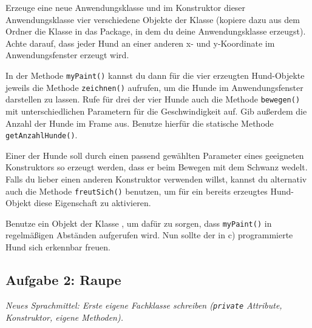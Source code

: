\begin{compactenum}[a)]
\item Erzeuge eine neue Anwendungsklasse  und im
Konstruktor dieser Anwendungsklasse vier verschiedene Objekte der Klasse 
 (kopiere dazu aus dem Ordner  
die Klasse  in das Package, in dem du deine Anwendungsklasse 
erzeugst). Achte darauf, dass jeder Hund an einer anderen x- und y-Koordinate 
im Anwendungsfenster erzeugt wird. 

\item In der Methode \lstinline|myPaint()| kannst du dann für die vier
erzeugten Hund-Objekte jeweils die Methode \lstinline|zeichnen()| aufrufen,
um die Hunde im Anwendungsfenster darstellen zu lassen. Rufe für drei der 
vier Hunde auch die Methode \lstinline|bewegen()| mit unterschiedlichen 
Parametern für die Geschwindigkeit auf. Gib außerdem die Anzahl der Hunde 
im Frame aus. Benutze hierfür die statische Methode \lstinline|getAnzahlHunde()|.

\item Einer der Hunde soll durch einen passend gewählten Parameter eines geeigneten
Konstruktors so erzeugt werden, dass er beim Bewegen mit dem Schwanz wedelt.
Falls du lieber einen anderen Konstruktor verwenden willst, kannst du alternativ
auch die Methode \lstinline|freutSich()| benutzen, um für ein bereits erzeugtes
Hund-Objekt diese Eigenschaft zu aktivieren.

\item Benutze ein Objekt der Klasse , um dafür zu sorgen, dass
\lstinline|myPaint()| in regelmäßigen Abständen aufgerufen wird. Nun sollte der
in c) programmierte Hund sich erkennbar freuen.
\end{compactenum}


\subsection{Aufgabe 2: Raupe \tagPflicht}
\noindent \emph{Neues Sprachmittel: Erste eigene Fachklasse schreiben (\texttt{private} Attribute, Konstruktor, eigene Methoden).}

